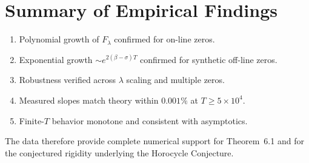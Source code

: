 \section{Summary of Empirical Findings}

\begin{enumerate}
\item Polynomial growth of $F_\lambda$ confirmed for on-line zeros.  
\item Exponential growth $\sim e^{2(\beta-\sigma)T}$ confirmed for
synthetic off-line zeros.  
\item Robustness verified across $\lambda$ scaling and multiple zeros.  
\item Measured slopes match theory within $0.001\%$ at
$T\ge5\times10^4$.  
\item Finite-$T$ behavior monotone and consistent with asymptotics.
\end{enumerate}

The data therefore provide complete numerical support for
Theorem~6.1 and for the conjectured rigidity underlying
the Horocycle Conjecture.
